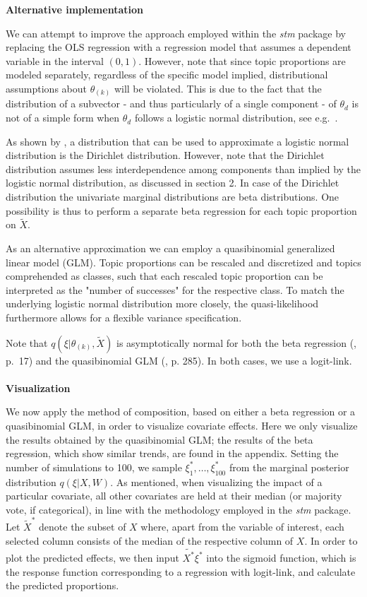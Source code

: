 \noindent \textbf{Alternative implementation} \vspace{10px}

\noindent We can attempt to improve the approach employed within the \textit{stm} package by replacing the OLS regression with a regression model that assumes a dependent variable in the interval $(0,1)$. However, note that since topic proportions are modeled separately, regardless of the specific model implied, distributional assumptions about $\theta_{(k)}$ will be violated. This is due to the fact that the distribution of a subvector - and thus particularly of a single component - of $\theta_d$ is not of a simple form when $\theta_d$ follows a logistic normal distribution, see e.g.\ \cite{atchison1980logistic}.

As shown by \cite{atchison1980logistic}, a distribution that can be used to approximate a logistic normal distribution is the Dirichlet distribution. However, note that the Dirichlet distribution assumes less interdependence among components than implied by the logistic normal distribution, as discussed in section 2. In case of the Dirichlet distribution the univariate marginal distributions are beta distributions. One possibility is thus to perform a separate beta regression for each topic proportion on $\tilde{X}$. 

As an alternative approximation we can employ a quasibinomial generalized linear model (GLM). Topic proportions can be rescaled and discretized and topics comprehended as classes, such that each rescaled topic proportion can be interpreted as the "number of successes" for the respective class. To match the underlying logistic normal distribution more closely, the quasi-likelihood furthermore allows for a flexible variance specification.

Note that $q(\xi| \theta_{(k)}, \tilde{X})$ is asymptotically normal for both the beta regression (\citealp{ferrari2004beta}, p.\ 17) and the quasibinomial GLM (\citealp{fahrmeir2007regression}, p. 285). In both cases, we use a logit-link. \\
\\
\noindent \textbf{Visualization} \vspace{10px}

\noindent We now apply the method of composition, based on either a beta regression or a quasibinomial GLM, in order to visualize covariate effects. Here we only visualize the results obtained by the quasibinomial GLM; the results of the beta regression, which show similar trends, are found in the appendix. Setting the number of simulations to 100, we sample $\xi^*_1, \dots, \xi^*_{100}$ from the  marginal posterior distribution $q(\xi | X, W)$. As mentioned, when visualizing the impact of a particular covariate, all other covariates are held at their median (or majority vote, if categorical), in line with the methodology employed in the \textit{stm} package.
Let $\tilde{X}^*$ denote the subset of $X$ where, apart from the variable of interest, each selected column consists of the median of the respective column of $X$. In order to plot the predicted effects, we then input $\tilde{X^*}\xi^*$ into the sigmoid function, which is the response function corresponding to a regression with logit-link, and calculate the predicted proportions. 

